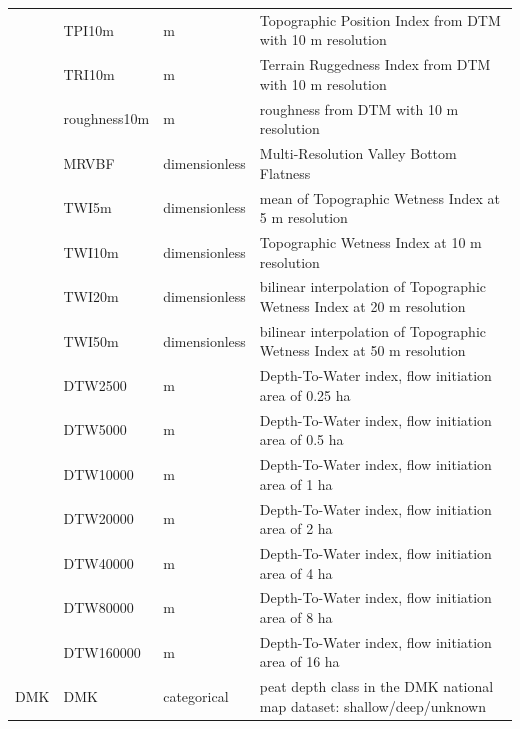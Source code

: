 \documentclass[soil, manuscript]{copernicus}
\begin{document}
\begin{table}[tbp]
\begin{tabular}{llll}
             & TPI10m       & m                     & Topographic Position Index from DTM with 10 m resolution               \\
             & TRI10m       & m                     & Terrain Ruggedness Index from DTM with 10 m resolution                 \\
             & roughness10m & m                     & roughness from DTM with 10 m resolution                                \\
             & MRVBF        & dimensionless         & Multi-Resolution Valley Bottom Flatness                                \\
             & TWI5m        & dimensionless         & mean of Topographic Wetness Index at 5 m resolution                    \\
             & TWI10m       & dimensionless         & Topographic Wetness Index at 10 m resolution                           \\
             & TWI20m       & dimensionless         & bilinear interpolation of Topographic Wetness Index at 20 m resolution \\
             & TWI50m       & dimensionless         & bilinear interpolation of Topographic Wetness Index at 50 m resolution \\
             & DTW2500      & m                     & Depth-To-Water index, flow initiation area of 0.25 ha                  \\
             & DTW5000      & m                     & Depth-To-Water index, flow initiation area of 0.5 ha                   \\
             & DTW10000     & m                     & Depth-To-Water index, flow initiation area of 1 ha                     \\
             & DTW20000     & m                     & Depth-To-Water index, flow initiation area of 2 ha                     \\
             & DTW40000     & m                     & Depth-To-Water index, flow initiation area of 4 ha                     \\
             & DTW80000     & m                     & Depth-To-Water index, flow initiation area of 8 ha                     \\
             & DTW160000    & m                     & Depth-To-Water index, flow initiation area of 16 ha                    \\
DMK          & DMK          & categorical           & peat depth class in the DMK national map dataset: shallow/deep/unknown \\ \hline
\end{tabular}
\label{tab:preds}
\end{table}
\end{document}
